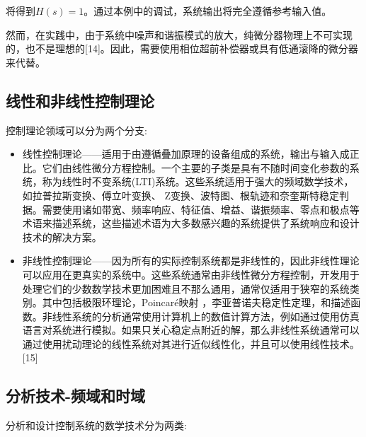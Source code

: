 将得到$H(s) = 1$。通过本例中的调试，系统输出将完全遵循参考输入值。

然而，在实践中，由于系统中噪声和谐振模式的放大，纯微分器物理上不可实现的，也不是理想的[14]。因此，需要使用相位超前补偿器或具有低通滚降的微分器来代替。

\subsection{线性和非线性控制理论}

控制理论领域可以分为两个分支:

\begin{itemize}
\item 线性控制理论——适用于由遵循叠加原理的设备组成的系统，输出与输入成正比。它们由线性微分方程控制。一个主要的子类是具有不随时间变化参数的系统，称为线性时不变系统(LTI)系统。这些系统适用于强大的频域数学技术，如拉普拉斯变换、傅立叶变换、 Z变换、波特图、根轨迹和奈奎斯特稳定判据。需要使用诸如带宽、频率响应、特征值、增益、谐振频率、零点和极点等术语来描述系统，这些描述术语为大多数感兴趣的系统提供了系统响应和设计技术的解决方案。
\item 非线性控制理论——因为所有的实际控制系统都是非线性的，因此非线性理论可以应用在更真实的系统中。这些系统通常由非线性微分方程控制，开发用于处理它们的少数数学技术更加困难且不那么通用，通常仅适用于狭窄的系统类别。其中包括极限环理论，Poincaré映射 ，李亚普诺夫稳定性定理，和描述函数。非线性系统的分析通常使用计算机上的数值计算方法，例如通过使用仿真语言对系统进行模拟。如果只关心稳定点附近的解，那么非线性系统通常可以通过使用扰动理论的线性系统对其进行近似线性化，并且可以使用线性技术。[15]
\end{itemize}

\subsection{分析技术-频域和时域}

分析和设计控制系统的数学技术分为两类:

